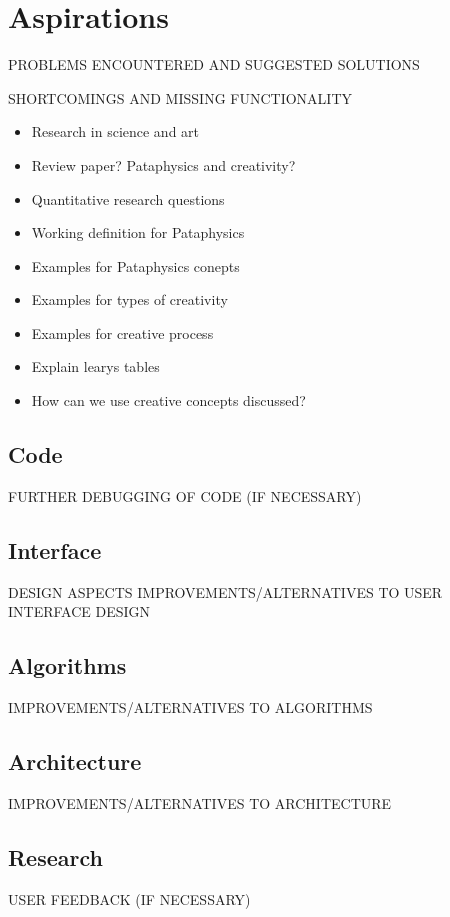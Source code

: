 
\chapter{Aspirations}
\label{ch:future}

PROBLEMS ENCOUNTERED AND SUGGESTED SOLUTIONS

SHORTCOMINGS AND MISSING FUNCTIONALITY

\begin{itemize}
  \item Research in science and art
  \item Review paper? Pataphysics and creativity?
  \item Quantitative research questions
  \item Working definition for Pataphysics
  \item Examples for Pataphysics conepts
  \item Examples for types of creativity
  \item Examples for creative process
  \item Explain learys tables
  \item How can we use creative concepts discussed?
\end{itemize}


\section{Code}

FURTHER DEBUGGING OF CODE (IF NECESSARY)

\section{Interface}

DESIGN ASPECTS
IMPROVEMENTS/ALTERNATIVES TO USER INTERFACE DESIGN

\section{Algorithms}

IMPROVEMENTS/ALTERNATIVES TO ALGORITHMS

\section{Architecture}

IMPROVEMENTS/ALTERNATIVES TO ARCHITECTURE

\section{Research}

USER FEEDBACK (IF NECESSARY)
